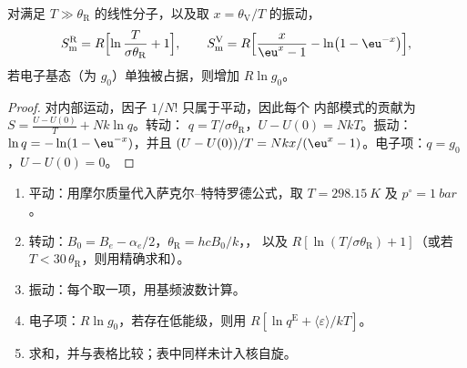 \begin{proposition}[转动和振动摩尔熵]\label{prop:b3:partition-functions:modes-entropy}
对满足 $T \gg \theta_{\mathrm R}$ 的线性分子，以及取 $x = \theta_{\mathrm V}/T$ 的振动，
\[
  S^{\mathrm R}_{\mathrm m} = R\Bigl[\ln\frac{T}{\sigma\theta_{\mathrm R}} + 1\Bigr],
  \qquad
  S^{\mathrm V}_{\mathrm m} = R\Bigl[\frac{x}{\eu^x - 1} - \ln\bigl(1 - \eu^{-x}\bigr)\Bigr],
\]
若电子基态（为 $g_0$）单独被占据，则增加 $R\ln g_0$。
\end{proposition}

\begin{proof}
对内部运动，因子 $1/N!$ 只属于平动，因此每个
内部模式的贡献为 $S = \frac{U - U(0)}{T} + Nk\ln q$。转动：
$q = T/\sigma\theta_{\mathrm R}$，$U - U(0) = NkT$。振动：$\ln q = -\ln(1 - \eu^{-x})$，并且
$(U - U(0))/T = Nkx/(\eu^x - 1)$。电子项：$q = g_0$，$U - U(0) = 0$。
\end{proof}

\begin{method}[由常数求气体的标准熵]\label{met:b3:partition-functions:standard-entropy}
\begin{enumerate}
  \item 平动：用摩尔质量代入萨克尔–特特罗德公式，取 $T = \qty{298.15}{K}$ 及
        $p^\circ = \qty{1}{bar}$。
  \item 转动：$B_0 = B_e - \alpha_e/2$，$\theta_{\mathrm R} = hcB_0/k$，，
        以及 $R[\ln(T/\sigma\theta_{\mathrm R}) + 1]$（或若 $T < 30\,\theta_{\mathrm R}$，则用精确求和）。
  \item 振动：每个取一项，用基频波数计算。
  \item 电子项：$R\ln g_0$，若存在低能级，则用 $R[\ln q^{\mathrm E} + \langle\varepsilon\rangle/kT]$。
  \item 求和，并与表格比较；表中同样未计入核自旋。
\end{enumerate}
\end{method}

